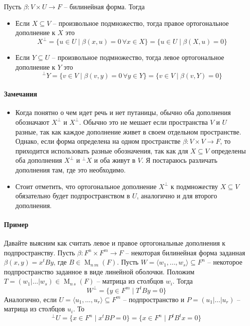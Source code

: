 \begin{definition}
Пусть $\beta\colon V\times U\to F$ -- билинейная форма. Тогда
\begin{itemize}
\item Если $X\subseteq V$ -- произвольное подмножество, тогда правое ортогональное дополнение к $X$ это
\[
X^\bot = \{u\in U \mid \beta(x,u) = 0\,\forall x\in X\} = \{u\in U\mid \beta(X,u) = 0\}
\]
\item Если $Y\subseteq U$ -- произвольное подмножество, тогда левое ортогональное дополнение к $Y$ это
\[
{}^\bot Y = \{v\in V\mid \beta(v, y) = 0\,\forall y\in Y\} = \{v\in V\mid \beta(v, Y) = 0\}
\]
\end{itemize}
\end{definition}

\paragraph{Замечания}
\begin{itemize}
\item
Когда понятно о чем идет речь и нет путаницы, обычно оба дополнения обозначают $X^\bot$ и $X^\bot$. Обычно это не мешает если пространства $V$ и $U$ разные, так как каждое дополнение живет в своем отдельном пространстве. Однако, если форма определена на одном пространстве $\beta\colon V\times V\to F$, то приходится использовать разные обозначения, так как для $X\subseteq V$ определены оба дополнения $X^\bot$ и ${}^\bot X$ и оба живут в $V$. Я постараюсь различать дополнения там, где это необходимо.

\item 
Стоит отметить, что ортогональное дополнение $X^\bot$ к подмножеству $X\subseteq V$ обязательно будет подпространством в $U$, аналогично и для второго дополнения.
\end{itemize}


\paragraph{Пример}
Давайте выясним как считать левое и правое ортогональные дополнения к подпространству. Пусть $\beta\colon F^n\times F^m \to F$ -- некоторая билинейная форма заданная $\beta(x,y) = x^t B y$, где $B\in \operatorname{M}_{n\,m}(F)$. Пусть $W = \langle w_1,\ldots,w_s\rangle\subseteq F^n$ -- некоторое подпространство заданное в виде линейной оболочки. Положим $T = (w_1|\ldots|w_s)\in\operatorname{M}_{n\,s}(F)$ -- матрица из столбцов $w_i$. Тогда 
\[
W^\bot = \{y\in F^m \mid T^t By = 0\}
\]
Аналогично, если $U=\langle u_1,\ldots,u_r \rangle \subseteq F^m$ -- подпространство и $P = (u_1|\ldots|u_r)$ -- матрица из столбцов $u_i$. То
\[
{}^\bot U = \{x\in F^n\mid x^t B P = 0\} = 
\{x\in F^n \mid P^t B^t x = 0\}
\]


